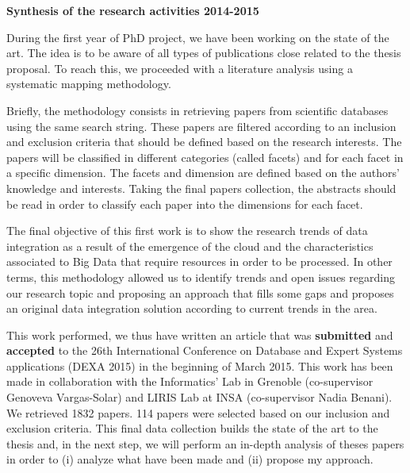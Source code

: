 \documentclass[12pt,a4paper,oneside]{report}
\begin{document}

\begin{flushleft}
\textbf{Synthesis of the research activities 2014-2015}\\
\end{flushleft}
During the first year of PhD project, we have been working on the state of the art. The idea is to be aware of all types of publications close related to the thesis proposal. To reach this, we proceeded with a literature analysis using a systematic mapping methodology. 

Briefly, the methodology consists in retrieving papers from scientific databases using the same search string. These papers are filtered according to an inclusion and exclusion criteria that should be defined based on the research interests. The papers will be classified in different categories (called facets) and for each facet in a specific dimension. The facets and dimension are defined based on the authors’ knowledge and interests. Taking the final papers collection, the abstracts should be read in order to classify each paper into the dimensions for each facet. 

The final objective of this first work is to show the research trends of data integration as a result of the emergence of the cloud and the characteristics associated to Big Data that require resources in order to be processed. In other terms, this methodology allowed us to identify trends and open issues regarding our research topic and proposing an approach that fills some gaps and proposes an original data integration solution according to current trends in the area.

This work performed, we thus have written an article that was \textbf{submitted} and \textbf{accepted} to the 26th International Conference on Database and Expert Systems applications (DEXA 2015) in the beginning of March 2015. This work has been made in collaboration with the Informatics’ Lab in Grenoble (co-supervisor Genoveva Vargas-Solar) and LIRIS Lab at INSA (co-supervisor Nadia Benani). We retrieved 1832 papers. 114 papers were selected based on our inclusion and exclusion criteria. This final data collection builds the state of the art to the thesis and, in the next step, we will perform an in-depth analysis of theses papers in order to (i) analyze what have been made and (ii) propose my approach.  
\end{document}
